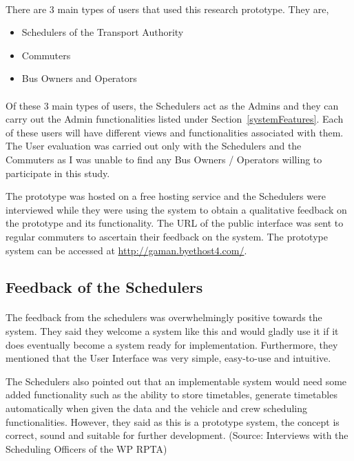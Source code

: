 \documentclass[12pt, oneside]{report}
\begin{document}
\paragraph{} There are 3 main types of users that used this research prototype. They are,

\begin{itemize}
\item Schedulers of the Transport Authority
\item Commuters
\item Bus Owners and Operators
\end{itemize}

\paragraph{} Of these 3 main types of users, the Schedulers act as the Admins and they can carry out the Admin functionalities listed under Section~\ref{systemFeatures}. Each of these users will have different views and functionalities associated with them. The User evaluation was carried out only with the Schedulers and the Commuters as I was unable to find any Bus Owners / Operators willing to participate in this study.

The prototype was hosted on a free hosting service and the Schedulers were interviewed while they were using the system to obtain a qualitative feedback on the prototype and its functionality. The URL of the public interface was sent to regular commuters to ascertain their feedback on the system. The prototype system can be accessed at \url{http://gaman.byethost4.com/}.

\subsection{Feedback of the Schedulers}

\paragraph{} The feedback from the schedulers was overwhelmingly positive towards the system. They said they welcome a system like this and would gladly use it if it does eventually become a system ready for implementation. Furthermore, they mentioned that the User Interface was very simple, easy-to-use and intuitive.

The Schedulers also pointed out that an implementable system would need some added functionality such as the ability to store timetables, generate timetables automatically when given the data and the vehicle and crew scheduling functionalities. However, they said as this is a prototype system, the concept is correct, sound and suitable for further development. (Source: Interviews with the Scheduling Officers of the WP RPTA)
\end{document}
